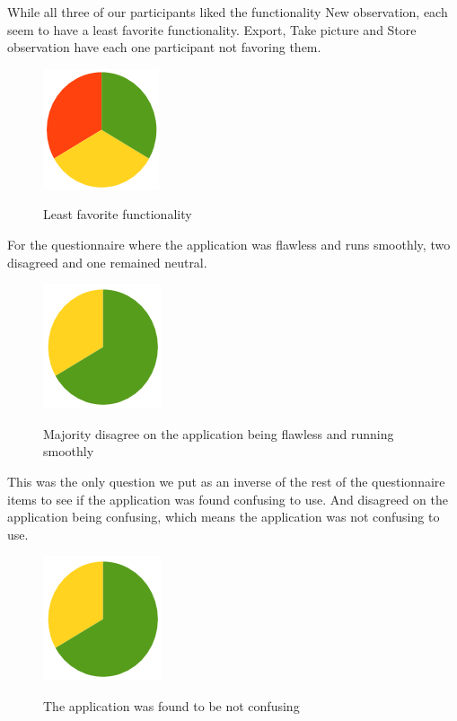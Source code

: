While all three of our participants liked the functionality New observation, each seem to have a least favorite functionality. Export, Take picture and Store observation have each one participant not favoring them.

\begin{figure}[htb]
    \centering
    \includegraphics[scale=0.7]{ut_pic/Functionalitydislike.png}
    \label{fig:Functionality favourability}
    \caption{Least favorite functionality}
\end{figure}

For the questionnaire where the application was flawless and runs smoothly, two disagreed and one remained neutral.

\begin{figure}[htb]
    \centering
    \includegraphics[scale=0.7]{ut_pic/flawless.png}
    \label{fig:App was flawless}
    \caption{Majority disagree on the application being flawless and running smoothly}
\end{figure}

This was the only question we put as an inverse of the rest of the questionnaire items to see if the application was found confusing to use. And disagreed on the application being confusing, which means the application was not confusing to use.

\begin{figure}[htb]
    \centering
    \includegraphics[scale=0.7]{ut_pic/flawless.png}
    \label{fig:App was confusing to use}
    \caption{The application was found to be not confusing}
\end{figure}

